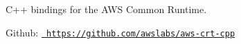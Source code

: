 \label{index_md_index}%
%
 C++ bindings for the AWS Common Runtime.

Github\+: \href{https://github.com/awslabs/aws-crt-cpp}{\texttt{ https\+://github.\+com/awslabs/aws-\/crt-\/cpp}} 